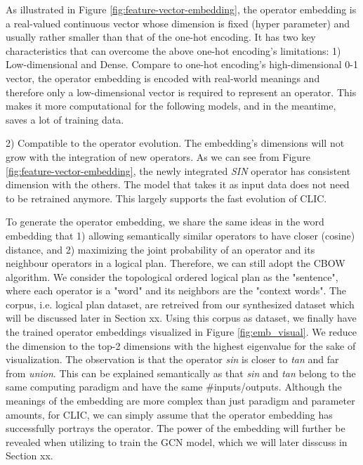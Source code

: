As illustrated in Figure \ref{fig:feature-vector-embedding}, 
the operator embedding is a real-valued continuous vector whose dimension is fixed (hyper parameter) and usually rather smaller than that of the one-hot encoding.
It has two key characteristics that can overcome the above one-hot encoding's limitations:
1) Low-dimensional and Dense. 
Compare to one-hot encoding's high-dimensional 0-1 vector, 
the operator embedding is encoded with real-world meanings and therefore only a low-dimensional vector is required to represent an operator.
This makes it more computational for the following models, and in the meantime, saves a lot of training data.

2) Compatible to the operator evolution. The embedding's dimensions will not grow with the integration of new operators. 
As we can see from Figure \ref{fig:feature-vector-embedding}, the newly integrated \textit{SIN} operator has consistent dimension with the others.
The model that takes it as input data does not need to be retrained anymore. 
This largely supports the fast evolution of CLIC.

To generate the operator embedding, we share the same ideas in the word embedding that
1) allowing semantically similar operators to have closer (cosine) distance, 
and 2) maximizing the joint probability of an operator and its neighbour operators in a logical plan.
Therefore, we can still adopt the CBOW algorithm.
We consider the topological ordered logical plan as the "sentence", where each operator is a "word" and its neighbors are the "context words". 
The corpus, i.e. logical plan dataset, are retreived from our synthesized dataset which will be discussed later in Section xx.
Using this corpus as dataset, we finally have the trained operator embeddings visualized in Figure \ref{fig:emb_visual}.
We reduce the dimension to the top-2 dimensions with the highest eigenvalue for the sake of visualization.
The observation is that the operator \textit{sin} is closer to \textit{tan} and far from \textit{union}.
This can be explained semantically as that \textit{sin} and \textit{tan} belong to the same computing paradigm and have the same \#inputs/outputs.
Although the meanings of the embedding are more complex than just paradigm and parameter amounts, 
for CLIC, 
we can simply assume that the operator embedding has successfully portrays the operator.
The power of the embedding will further be revealed when utilizing to train the GCN model, which we will later disscuss in Section xx.

